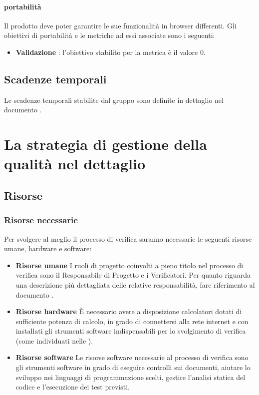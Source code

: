 			\paragraph{portabilità}
		 	Il prodotto deve poter garantire le sue funzionalità in browser differenti.
		 	Gli obiettivi di portabilità e le metriche ad essi associate sono i seguenti:
		 	\begin{itemize}
				\item \textbf{Validazione }: l'obiettivo stabilito per la metrica è il valore 0.
			\end{itemize}
	\subsection{Scadenze temporali}
	Le scadenze temporali stabilite dal gruppo sono definite in dettaglio nel documento \PdP.




\section{La strategia di gestione della qualità nel dettaglio}
	\subsection{Risorse}
		\subsubsection{Risorse necessarie}
		Per svolgere al meglio il processo di verifica saranno necessarie le seguenti risorse umane, hardware e software:
		\begin{itemize}
			\item \textbf{Risorse umane}
			I ruoli di progetto coinvolti a pieno titolo nel processo di verifica sono il Responsabile di Progetto e i Verificatori. Per quanto riguarda una descrizione più dettagliata delle relative responsabilità, fare riferimento al documento \NdP.
			\item \textbf{Risorse hardware}
			  È necessario avere a disposizione calcolatori dotati di sufficiente potenza di calcolo, in grado di connettersi alla rete internet e con installati gli strumenti software indispensabili per lo svolgimento di verifica (come individuati nelle \NdP).
			\item \textbf{Risorse software}
			Le risorse software necessarie al processo di verifica sono gli strumenti software in grado di eseguire controlli sui documenti, aiutare lo sviluppo nei linguaggi di programmazione scelti, gestire l'analisi statica del codice e l'esecuzione dei test previsti.
		\end{itemize}
